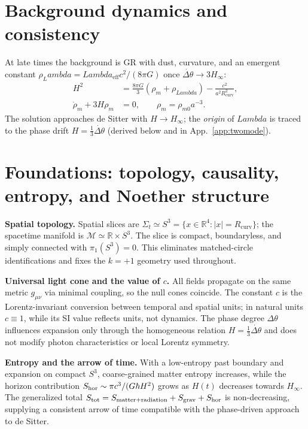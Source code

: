 \documentclass[twocolumn,aps,prd,showpacs,nofootinbib,superscriptaddress]{revtex4-2}
\def\Lambda{Lambda}%
\newcommand{\Lgeff}{\Lambda_{\mathrm{eff}}}
\newcommand{\Rcurv}{R_{\mathrm{curv}}}
\begin{document}
\section{Background dynamics and consistency}
\label{sec:background}
At late times the background is GR with dust, curvature, and an emergent constant $\rho_\Lambda=\Lgeff c^2/(8\pi G)$ once $\dot{\Delta\theta}\to 3H_\infty$:
\begin{align}
H^2 &= \frac{8\pi G}{3}\left(\rho_m + \rho_{\Lambda}\right) - \frac{c^2}{a^2\Rcurv^2},
\label{eq:fried1}\\
\dot{\rho}_m + 3H\rho_m&=0,\qquad \rho_m=\rho_{m0}a^{-3}.
\label{eq:fried2}
\end{align}
The solution approaches de Sitter with $H\to H_\infty$; the \emph{origin} of $\Lambda$ is traced to the phase drift $H=\tfrac{1}{3}\dot{\Delta\theta}$ (derived below and in App.~\ref{app:twomode}).

\section{Foundations: topology, causality, entropy, and Noether structure}
\label{sec:foundations}
\noindent\textbf{Spatial topology.}
Spatial slices are $\Sigma_t\simeq S^3=\{x\in\mathbb{R}^4:|x|=\Rcurv\}$; the spacetime manifold is $\mathcal{M}\simeq\mathbb{R}\times S^3$. The slice is compact, boundaryless, and simply connected with $\pi_1(S^3)=0$. This eliminates matched-circle identifications and fixes the $k=+1$ geometry used throughout.

\noindent\textbf{Universal light cone and the value of $c$.}
All fields propagate on the same metric $g_{\mu\nu}$ via minimal coupling, so the null cones coincide. The constant $c$ is the Lorentz-invariant conversion between temporal and spatial units; in natural units $c\equiv 1$, while its SI value reflects units, not dynamics. The phase degree $\Delta\theta$ influences expansion only through the homogeneous relation $H=\tfrac{1}{3}\dot{\Delta\theta}$ and does not modify photon characteristics or local Lorentz symmetry.

\noindent\textbf{Entropy and the arrow of time.}
With a low-entropy past boundary and expansion on compact $S^3$, coarse-grained matter entropy increases, while the horizon contribution $S_{\rm hor}\sim \pi c^3/(G\hbar H^2)$ grows as $H(t)$ decreases towards $H_\infty$. The generalized total $S_{\rm tot}=S_{\rm matter+radiation}+S_{\rm grav}+S_{\rm hor}$ is non-decreasing, supplying a consistent arrow of time compatible with the phase-driven approach to de Sitter.
\end{document}
